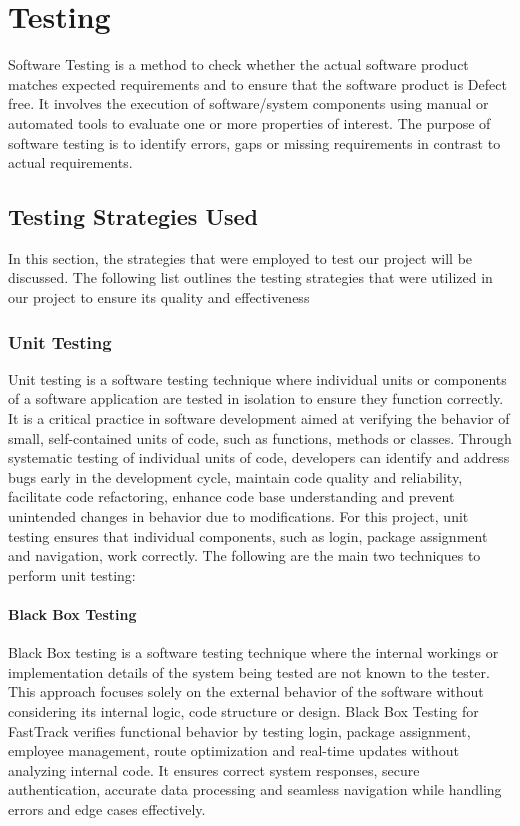 \chapter{Testing}
\label{Testing}
Software Testing is a method to check whether the actual software product matches
expected requirements and to ensure that the software product is Defect free. It involves
the execution of software/system components using manual or automated tools to evaluate
one or more properties of interest. The purpose of software testing is to identify errors,
gaps or missing requirements in contrast to actual requirements.
\section{Testing Strategies Used}
 In this section, the strategies that were employed to test our project will be discussed. The
 following list outlines the testing strategies that were utilized in our project to ensure its
 quality and effectiveness
 \subsection{Unit Testing}
Unit testing is a software testing technique where individual units or components of a
software application are tested in isolation to ensure they function correctly. It is a critical
practice in software development aimed at verifying the behavior of small, self-contained
units of code, such as functions, methods or classes. Through systematic testing of individual units of code, developers can identify and address bugs early in the development cycle, maintain code
quality and reliability, facilitate code refactoring, enhance code base understanding and
prevent unintended changes in behavior due to modifications. For this project, unit testing ensures that individual components, such as login, package assignment and navigation, work correctly.
The following are the main
two techniques to perform unit testing:
\subsubsection{Black Box Testing}
Black Box testing is a software testing technique where the internal workings or
implementation details of the system being tested are not known to the tester. This approach focuses solely on the external behavior of the software without
considering its internal logic, code structure or design. Black Box Testing for FastTrack verifies functional behavior by testing login, package assignment, employee management, route optimization and real-time updates without analyzing internal code. It ensures correct system responses, secure authentication, accurate data processing and seamless navigation while handling errors and edge cases effectively.
